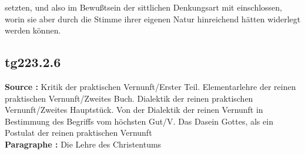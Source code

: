 \documentclass[a4paper,12pt,twoside]{book}
\begin{document}
setzten, und also im Bewußtsein der sittlichen Denkungsart mit einschlossen, worin sie aber durch die Stimme ihrer eigenen Natur hinreichend hätten widerlegt werden können. 
	
	\subsection*{tg223.2.6} 
	\textbf{Source : }Kritik der praktischen Vernunft/Erster Teil. Elementarlehre der reinen praktischen Vernunft/Zweites Buch. Dialektik der reinen praktischen Vernunft/Zweites Hauptstück. Von der Dialektik der reinen Vernunft in Bestimmung des Begriffs vom höchsten Gut/V. Das Dasein Gottes, als ein Postulat der reinen praktischen Vernunft\\  
	
	\noindent\textbf{Paragraphe : }Die Lehre des Christentums
	
\end{document}

